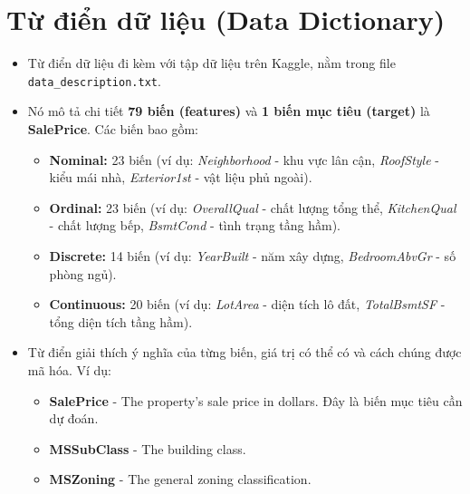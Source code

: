 


\section{Từ điển dữ liệu (Data Dictionary)}

\begin{itemize}
    \item Từ điển dữ liệu đi kèm với tập dữ liệu trên Kaggle, nằm trong file \texttt{data\_description.txt}.
    \item Nó mô tả chi tiết \textbf{79 biến (features)} và \textbf{1 biến mục tiêu (target)} là \textbf{SalePrice}. Các biến bao gồm:
    \begin{itemize}
        \item \textbf{Nominal:} 23 biến (ví dụ: \textit{Neighborhood} - khu vực lân cận, \textit{RoofStyle} - kiểu mái nhà, \textit{Exterior1st} - vật liệu phủ ngoài).
        \item \textbf{Ordinal:} 23 biến (ví dụ: \textit{OverallQual} - chất lượng tổng thể, \textit{KitchenQual} - chất lượng bếp, \textit{BsmtCond} - tình trạng tầng hầm).
        \item \textbf{Discrete:} 14 biến (ví dụ: \textit{YearBuilt} - năm xây dựng, \textit{BedroomAbvGr} - số phòng ngủ).
        \item \textbf{Continuous:} 20 biến (ví dụ: \textit{LotArea} - diện tích lô đất, \textit{TotalBsmtSF} - tổng diện tích tầng hầm).
    \end{itemize}
    \item Từ điển giải thích ý nghĩa của từng biến, giá trị có thể có và cách chúng được mã hóa. Ví dụ:
    \begin{itemize}
        \item \textbf{SalePrice} - The property's sale price in dollars. Đây là biến mục tiêu cần dự đoán.
        \item \textbf{MSSubClass} - The building class.
        \item \textbf{MSZoning} - The general zoning classification.
    \end{itemize}
\end{itemize}

